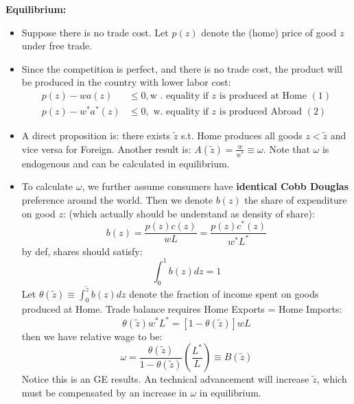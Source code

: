 \documentclass{book}
\theoremstyle{plain}
\theoremstyle{definition}
\newcommand{\mytitle}[1]{{\large{\textbf{#1}}}}
\begin{document}
\mytitle{Equilibrium:}
\begin{itemize}
	\item Suppose there is no trade cost. Let $p(z)$ denote the (home) price of good $z$ under free trade.
	\item Since the competition is perfect, and there is no trade cost, the product will be produced in the country with lower labor cost:
	\[\begin{aligned} p(z)-w a(z) & \leq 0, \text {w . equality if } z \text { is produced at Home }(1) \\ p(z)-w^{*} a^{*}(z) & \leq 0, \text { w. equality if } z \text { is produced Abroad }(2) \end{aligned}\]
	\item A direct proposition is: there exists $\tilde z$ s.t. Home produces all goods $z<\tilde z$ and vice versa for Foreign.
	Another result is: $A(\tilde z) = \frac{w}{w^*}\equiv \omega$. Note that $\omega$ is endogenous and can be calculated in equilibrium.
	\item To calculate $\omega$, we further assume consumers have \textbf{identical Cobb Douglas} preference around the world. Then we denote $b(z)$ the share of expenditure on good $z$: (which actually should be understand as density of share):
	\[
	b(z)=\frac{p(z) c(z)}{w L}=\frac{p(z) c^{*}(z)}{w^{*} L^{*}}
 	\]
 	by def, shares should satisfy:
 	\[\int_{0}^{1} b(z) d z=1\]
 	Let $\theta(\widetilde{z}) \equiv \int_{0}^{\widetilde{z}} b(z) d z$ denote the fraction of income spent on goods produced at Home. Trade balance requires Home Exports = Home Imports:
 	\[\theta(\widetilde{z}) w^{*} L^{*}=[1-\theta(\widetilde{z})] w L\]
 	then we have relative wage to be:
 	\[\omega=\frac{\theta(\widetilde{z})}{1-\theta(\widetilde{z})}\left(\frac{L^{*}}{L}\right) \equiv B(\widetilde{z})\]
 	Notice this is an GE results. An technical advancement will increase $\tilde z$, which must be compensated by an increase in $\omega$ in equilibrium.
\end{itemize}
\end{document}
